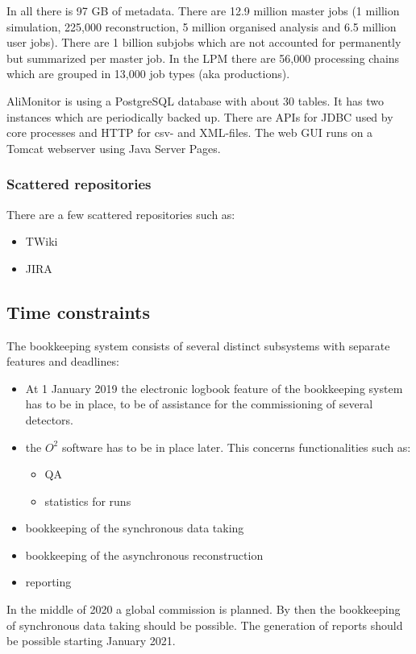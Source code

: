 In all there is 97 GB of metadata. There are 12.9 million master jobs (1 million simulation, 225,000 reconstruction, 5 million organised analysis and 6.5 million user jobs). There are 1 billion subjobs which are not accounted for permanently but summarized per master job. In the LPM there are 56,000 processing chains which are grouped in 13,000 job types (aka productions).

AliMonitor is using a PostgreSQL database with about 30 tables. It has two instances which are periodically backed up. There are APIs for JDBC used by core processes and HTTP for csv- and XML-files. The web GUI runs on a Tomcat webserver using Java Server Pages.

\subsubsection{Scattered repositories}
There are a few scattered repositories such as:
\begin{itemize}
  \item TWiki
  \item JIRA
\end{itemize}


\subsection{Time constraints}

The bookkeeping system consists of several distinct subsystems with separate features and deadlines:
\begin{itemize}
  \item At 1 January 2019 the electronic logbook feature of the bookkeeping system has to be in place, to be of assistance for the commissioning of several detectors. 
  \item the $O^2$ software has to be in place later. This concerns functionalities such as:
  \begin{itemize}
    \item QA
    \item statistics for runs
  \end{itemize}
  \item bookkeeping of the synchronous data taking
  \item bookkeeping of the asynchronous reconstruction
  \item reporting
\end{itemize}
In the middle of 2020 a global commission is planned. By then the bookkeeping of synchronous data taking should be possible. The generation of reports should be possible starting January 2021.

